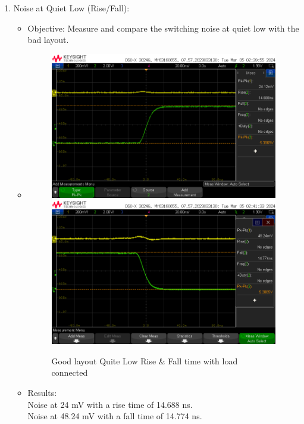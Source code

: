 \documentclass[a4paper,11pt]{article}%
\begin{document}
\begin{enumerate}
	\item Noise at Quiet Low (Rise/Fall):
	\begin{itemize}
		\item Objective: Measure and compare the switching noise at quiet low with the bad layout.
		\item 
		\begin{figure}[H]
			\centering
			\includegraphics[scale=0.6]{figures/good/quite_low/rise/rising_good_low.png}
			\includegraphics[scale=0.6]{figures/good/quite_low/fall/falling_ql_good.png}
			\caption{Good layout Quite Low Rise \& Fall time with load connected}
		\end{figure}
		\item Results:\\
		Noise at 24 mV with a rise time of 14.688 ns.\\
		Noise at 48.24 mV with a fall time of 14.774 ns.\\
	\end{itemize}
	
\end{enumerate}
\end{document}
